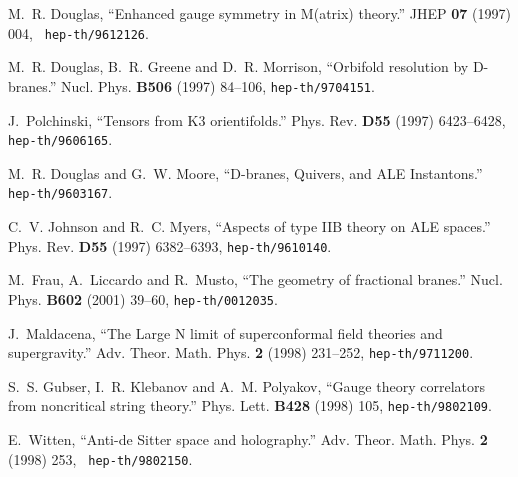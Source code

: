 \documentclass[a4paper,11pt]{article}
\begin{document}
\providecommand{\href}[2]{#2}\begingroup\raggedright\begin{thebibliography}{10}

M.~R. Douglas, ``Enhanced gauge symmetry in {M(atrix)} theory.'' JHEP {\bf 07}
  (1997) 004, \href{http://xxx.lanl.gov/abs/hep-th/9612126}{{\tt
  hep-th/9612126}}. %

M.~R. Douglas, B.~R. Greene and D.~R. Morrison, ``Orbifold resolution by
  D-branes.'' Nucl. Phys. {\bf B506} (1997) 84--106,
  \href{http://xxx.lanl.gov/abs/hep-th/9704151}{{\tt hep-th/9704151}}.

J.~Polchinski, ``Tensors from {K3} orientifolds.'' Phys. Rev. {\bf D55} (1997)
  6423--6428,
  \href{http://xxx.lanl.gov/abs/http://arXiv.org/abs/hep-th/9606165}{{\tt
  hep-th/9606165}}. %

M.~R. Douglas and G.~W. Moore, ``D-branes, Quivers, and ALE Instantons.''
  \href{http://xxx.lanl.gov/abs/hep-th/9603167}{{\tt hep-th/9603167}}.

C.~V. Johnson and R.~C. Myers, ``Aspects of type {IIB} theory on {ALE}
  spaces.'' Phys. Rev. {\bf D55} (1997) 6382--6393,
  \href{http://xxx.lanl.gov/abs/hep-th/9610140}{{\tt hep-th/9610140}}.

M.~Frau, A.~Liccardo and R.~Musto, ``The geometry of fractional branes.'' Nucl.
  Phys. {\bf B602} (2001) 39--60,
  \href{http://xxx.lanl.gov/abs/hep-th/0012035}{{\tt hep-th/0012035}}.

J.~Maldacena, ``The Large {N} limit of superconformal field theories and
  supergravity.'' Adv. Theor. Math. Phys. {\bf 2} (1998) 231--252,
  \href{http://xxx.lanl.gov/abs/hep-th/9711200}{{\tt hep-th/9711200}}.

S.~S. Gubser, I.~R. Klebanov and A.~M. Polyakov, ``Gauge theory correlators
  from noncritical string theory.'' Phys. Lett. {\bf B428} (1998) 105,
  \href{http://xxx.lanl.gov/abs/hep-th/9802109}{{\tt hep-th/9802109}}.

E.~Witten, ``{Anti-de Sitter} space and holography.'' Adv. Theor. Math. Phys.
  {\bf 2} (1998) 253, \href{http://xxx.lanl.gov/abs/hep-th/9802150}{{\tt
  hep-th/9802150}}. %


\end{thebibliography}
\end{document}
